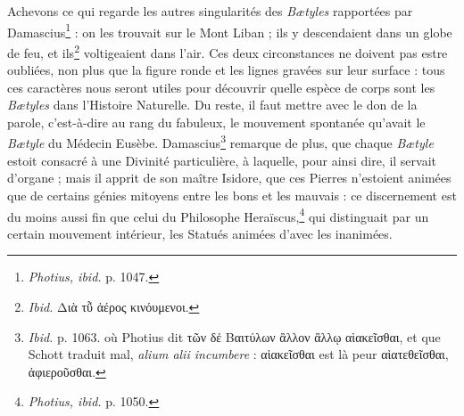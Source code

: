 \documentclass[a4paper, 11pt, oneside, polutonikogreek, french]{article}
\begin{document}
Achevons ce qui regarde les autres singularités des \emph{Bætyles} rapportées par Damascius\footnote{\emph{Photius, ibid.} p. 1047.} : on les trouvait sur le Mont Liban ; ils y descendaient dans un globe de feu, et ils\footnote{\emph{Ibid.} Διὰ τῧ ἀέρος κινόυμενοι.} voltigeaient dans l'air. Ces deux circonstances ne doivent pas estre oubliées, non plus que la figure ronde et les lignes gravées sur leur surface : tous ces caractères nous seront utiles pour découvrir quelle espèce de corps sont les \emph{Bætyles} dans l'Histoire Naturelle. Du reste, il faut mettre avec le don de la parole, c'est-à-dire au rang du fabuleux, le mouvement spontanée qu'avait le \emph{Bætyle} du Médecin Eusèbe. Damascius\footnote{\emph{Ibid.} p. 1063. où Photius dit τῶν δἐ Βαιτύλων ἂλλον ἂλλῳ αὶακεῖσθαι, et que Schott traduit mal, \emph{alium alii incumbere} : αὶακεῖσθαι est là peur αὶατεθεῖσθαι, ἀφιεροῦσθαι.} remarque de plus, que chaque \emph{Bætyle} estoit consacré à une Divinité particulière, à laquelle, pour ainsi dire, il servait d'organe ; mais il apprit de son maître Isidore, que ces Pierres n'estoient animées que de certains génies mitoyens entre les bons et les mauvais : ce discernement est du moins aussi fin que celui du Philosophe Heraïscus,\footnote{\emph{Photius, ibid.} p. 1050.} qui distinguait par un certain mouvement intérieur, les Statués animées d'avec les inanimées.
\end{document}
